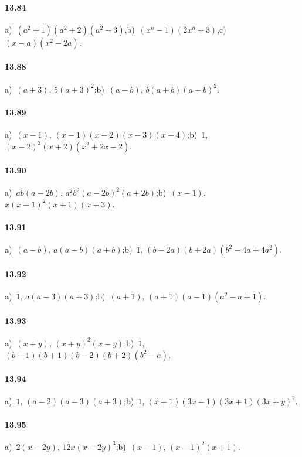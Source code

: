 \paragraph{13.84} a)~$(a^{2}+1)(a^{2}+2)(a^{2}+3)$,\quad b)~$(x^{n}-1)(2x^{n}+3)$,\quad c)~$(x-a)\left(x^{2}-2a\right)$.

\paragraph{13.88}
a)~$(a+3)$, $5(a+3)^2$;\quad b)~$(a-b)$, $b(a+b)(a-b)^2$.

\paragraph{13.89}
a)~$(x-1)$, $(x-1)(x-2)(x-3)(x-4)$;\quad b)~$1$, $(x-2)^2(x+2)\left(x^2+2x-2\right)$.

\paragraph{13.90}
a)~$ab(a-2b)$, $a^2 b^2(a-2b)^2(a+2b)$;\quad b)~$(x-1)$, $x(x-1)^2(x+1)(x+3)$.

\paragraph{13.91}
a)~$(a-b)$, $a(a-b)(a+b)$;\quad b)~$1$, $(b-2a)(b+2a)\left(b^2-4a+4a^2\right)$.

\paragraph{13.92}
a)~$1$, $a(a-3)(a+3)$;\quad b)~$(a+1)$, $(a+1)(a-1)\left(a^2-a+1\right)$.

\paragraph{13.93}
a)~$(x+y)$, $(x+y)^2(x-y)$;\quad b)~$1$, $(b-1)(b+1)(b-2)(b+2)\left(b^2-a\right)$.

\paragraph{13.94}
a)~$1$, $(a-2)(a-3)(a+3)$;\quad b)~$1$, $(x+1)(3x-1)(3x+1)(3x+y)^2$.

\paragraph{13.95}
a)~$2(x-2y)$, $12x(x-2y)^3$;\quad b)~$(x-1)$, $(x-1)^2(x+1)$.


